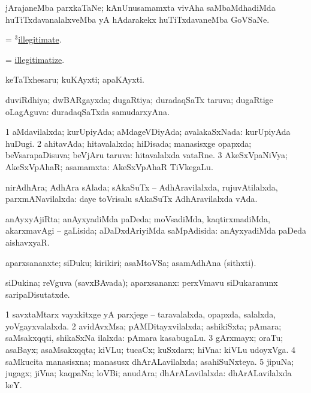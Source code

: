 \bentry
{}
\gl{\nA}
\bmng
jArajaneMba parxkaTaNe; kAnUnusamamxta vivAha saMbaMdhadiMda huTiTxdavanalalxveMba yA hAdarakekx huTiTxdavaneMba GoVSaNe. 
\emng
\eentry

\bentry
{}
\gl{\sakirx}
\bmng
 = \hyperlink{illegitimate(3)}{$^3$illegitimate}. 
\emng
\eentry

\bentry
{}
\gl{\sakirx}
\bmng
 = \hyperlink{illegitimatize}{illegitimatize}. 
\emng
\eentry

\bentry
{}
\gl{\nA}
\bmng
keTaTxhesaru; kuKAyxti; apaKAyxti. 
\emng
\eentry

\bentry
{}
\gl{\gu}
\bmng
duviRdhiya; dwBARgayxda; dugaRtiya; duradaqSaTx taruva; dugaRtige oLagAguva:  duradaqSaTxda samudarxyAna. 
\emng
\eentry

\bentry
{}
\gl{\gu}
\bmng
\bnum
\num{1} aMdavilalxda; kurUpiyAda; aMdageVDiyAda; avalakaSxNada:  kurUpiyAda huDugi. 
\num{2} ahitavAda; hitavalalxda; hiDisada; manasisxge opapxda; beVsarapaDisuva; beVjAru taruva:  hitavalalxda vataRne. 
\num{3} AkeSxVpaNiVya; AkeSxVpAhaR; asamamxta:  AkeSxVpAhaR TiVkegaLu. 
\enum
\emng
\eentry

\bentry
{}
\gl{\gu}
\bmng
nirAdhAra; AdhAra sAlada; sAkaSuTx -- AdhAravilalxda, rujuvAtilalxda, parxmANavilalxda:  daye toVrisalu sAkaSuTx AdhAravilalxda vAda. 
\emng
\eentry

\bentry
{}
\gl{\gu}
\bmng
anAyxyAjiRta; anAyxyadiMda paDeda; moVsadiMda, kaqtirxmadiMda, akarxmavAgi -- gaLisida; aDaDxdAriyiMda saMpAdisida:  anAyxyadiMda paDeda aishavxyaR. 
\emng
\eentry

\bentry
{}
\gl{\nA}
\bmng
aparxsananxte; siDuku; kirikiri; asaMtoVSa; asamAdhAna (sithxti). 
\emng
\eentry

\bentry
{}
\gl{\gu}
\bmng
siDukina; reVguva (savxBAvada); aparxsananx:  perxVmavu siDukaranunx saripaDisutatxde. 
\emng
\eentry

\bentry
{}
\gl{\gu}
\bmng
\bnum
\num{1} savxtaMtarx vayxkitxge yA parxjege -- taravalalxda, opapxda, salalxda, yoVgayxvalalxda. 
\num{2} avidAvxMsa; pAMDitayxvilalxda; ashikiSxta; pAmara; saMsakxqqti, shikaSxNa ilalxda:  pAmara kasabugaLu. 
\num{3} gArxmayx; oraTu; asaBayx; asaMsakxqqta; kiVLu; tucaCx; kuSxdarx; hiVna:  kiVLu udoyxVga. 
\num{4} saMkucita manasisxna; manasusx dhArALavilalxda; asahiSuNxteya. 
\num{5} jipuNa; jugagx; jiVna; kaqpaNa; loVBi; anudAra; dhArALavilalxda:  dhArALavilalxda keY. 
\enum
\emng
\eentry

